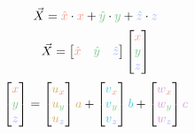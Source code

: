 \documentclass[preview]{standalone}
\begin{document}
$$\vec{X} = \textcolor[HTML]{f59789}{\hat{x}}\cdot \textcolor[HTML]{f59789}{x} + \textcolor[HTML]{7dc98c}{\hat{y}}\cdot \textcolor[HTML]{7dc98c}{y} + \textcolor[HTML]{96b1fe}{\hat{z}}\cdot \textcolor[HTML]{96b1fe}{z}$$
$$\vec{X} = \begin{bmatrix}\textcolor[HTML]{f59789}{\hat{x}}&\textcolor[HTML]{7dc98c}{\hat{y}}&\textcolor[HTML]{96b1fe}{\hat{z}}\end{bmatrix}\begin{bmatrix}\textcolor[HTML]{f59789}{x}\\\textcolor[HTML]{7dc98c}{y}\\\textcolor[HTML]{96b1fe}{z}\end{bmatrix}$$
$$\begin{bmatrix}\textcolor[HTML]{f59789}{x}\\\textcolor[HTML]{7dc98c}{y}\\\textcolor[HTML]{96b1fe}{z}\end{bmatrix} =
\begin{bmatrix}\textcolor[HTML]{d2b057}{u}_{\textcolor[HTML]{f59789}{x}}\\\textcolor[HTML]{d2b057}{u}_{\textcolor[HTML]{7dc98c}{y}}\\\textcolor[HTML]{d2b057}{u}_{\textcolor[HTML]{96b1fe}{z}}\end{bmatrix}\textcolor[HTML]{d2b057}{a} +
\begin{bmatrix}\textcolor[HTML]{43c8dc}{v}_{\textcolor[HTML]{f59789}{x}}\\\textcolor[HTML]{43c8dc}{v}_{\textcolor[HTML]{7dc98c}{y}}\\\textcolor[HTML]{43c8dc}{v}_{\textcolor[HTML]{96b1fe}{z}}\end{bmatrix}\textcolor[HTML]{43c8dc}{b} +
\begin{bmatrix}\textcolor[HTML]{dd99d8}{w}_{\textcolor[HTML]{f59789}{x}}\\\textcolor[HTML]{dd99d8}{w}_{\textcolor[HTML]{7dc98c}{y}}\\\textcolor[HTML]{dd99d8}{w}_{\textcolor[HTML]{96b1fe}{z}}\end{bmatrix}\textcolor[HTML]{dd99d8}{c}$$
\end{document}
